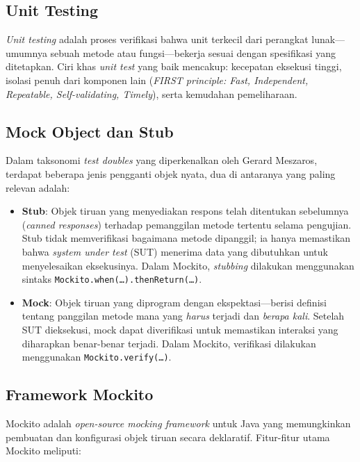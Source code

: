 \documentclass[12pt,a4paper]{article}
\begin{document}
\subsection{Unit Testing}

\textit{Unit testing} adalah proses verifikasi bahwa unit terkecil dari
perangkat lunak—umumnya sebuah metode atau fungsi—bekerja sesuai dengan
spesifikasi yang ditetapkan. Ciri khas \textit{unit test} yang baik mencakup:
kecepatan eksekusi tinggi, isolasi penuh dari komponen lain (\textit{FIRST
principle: Fast, Independent, Repeatable, Self-validating, Timely}), serta
kemudahan pemeliharaan.

\subsection{Mock Object dan Stub}

Dalam taksonomi \textit{test doubles} yang diperkenalkan oleh Gerard Meszaros,
terdapat beberapa jenis pengganti objek nyata, dua di antaranya yang paling
relevan adalah:

\begin{itemize}
    \item \textbf{Stub}: Objek tiruan yang menyediakan respons telah ditentukan
          sebelumnya (\textit{canned responses}) terhadap pemanggilan metode
          tertentu selama pengujian. Stub tidak memverifikasi bagaimana metode
          dipanggil; ia hanya memastikan bahwa \textit{system under test} (SUT)
          menerima data yang dibutuhkan untuk menyelesaikan eksekusinya.
          Dalam Mockito, \textit{stubbing} dilakukan menggunakan sintaks
          \texttt{Mockito.when(\ldots).thenReturn(\ldots)}.

    \item \textbf{Mock}: Objek tiruan yang diprogram dengan ekspektasi—berisi
          definisi tentang panggilan metode mana yang \emph{harus} terjadi
          dan \emph{berapa kali}. Setelah SUT dieksekusi, mock dapat
          diverifikasi untuk memastikan interaksi yang diharapkan benar-benar
          terjadi. Dalam Mockito, verifikasi dilakukan menggunakan
          \texttt{Mockito.verify(\ldots)}.
\end{itemize}

\subsection{Framework Mockito}

Mockito adalah \textit{open-source mocking framework} untuk Java yang
memungkinkan pembuatan dan konfigurasi objek tiruan secara deklaratif.
Fitur-fitur utama Mockito meliputi:
\end{document}
